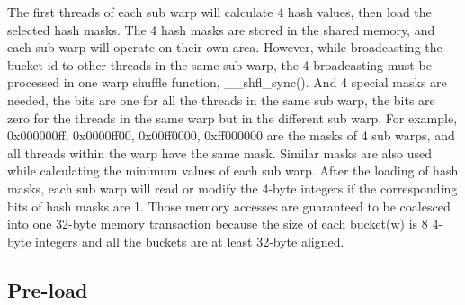 \documentclass[conference]{IEEEtran}
\begin{document}
The first threads of each sub warp will calculate 4 hash values, then load the selected hash masks. The 4 hash masks are stored in the shared memory, and each sub warp will operate on their own area. However, while broadcasting the bucket id to other threads in the same sub warp, the 4 broadcasting must be processed in one warp shuffle function, \_\_shfl\_sync(). And 4 special masks are needed, the bits are one for all the threads in the same sub warp, the bits are zero for the threads in the same warp but in the different sub warp. For example, 0x000000ff, 0x0000ff00, 0x00ff0000, 0xff000000 are the masks of 4 sub warps, and all threads within the warp have the same mask. Similar masks are also used while calculating the minimum values of each sub warp. After the loading of hash masks, each sub warp will read or modify the 4-byte integers if the corresponding bits of hash masks are 1. Those memory accesses are guaranteed to be coalesced into one 32-byte memory transaction because the size of each bucket(w) is 8 4-byte integers and all the buckets are at least 32-byte aligned.




\subsection{Pre-load}
\end{document}

